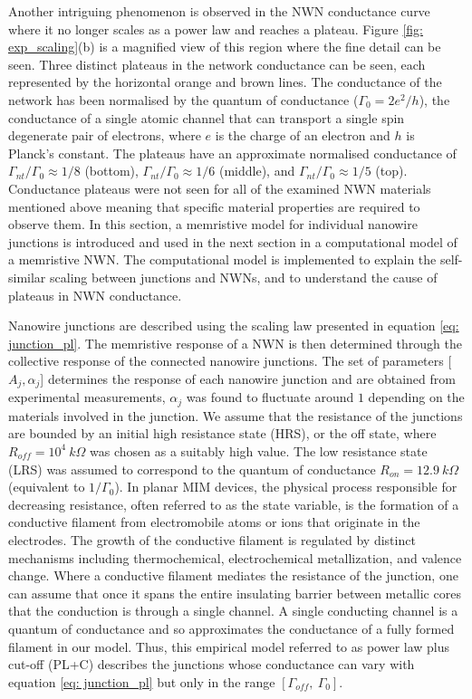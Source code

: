 Another intriguing phenomenon is observed in the NWN conductance curve where it no longer scales as a power law and reaches a plateau. Figure \ref{fig: exp_scaling}(b) is a magnified view of this region where the fine detail can be seen. Three distinct plateaus in the network conductance can be seen, each represented by the horizontal orange and brown lines. The conductance of the network has been normalised by the quantum of conductance ($\Gamma_0 = 2 e^2/h$), the conductance of a single atomic channel that can transport a single spin degenerate pair of electrons, where $e$ is the charge of an electron and $h$ is Planck's constant. The plateaus have an approximate normalised conductance of $\Gamma_{nt}/\Gamma_0 \approx 1/8$ (bottom), $\Gamma_{nt}/\Gamma_0 \approx 1/6$ (middle), and $\Gamma_{nt}/\Gamma_0 \approx 1/5$ (top). Conductance plateaus were not seen for all of the examined NWN materials mentioned above meaning that specific material properties are required to observe them. In this section, a memristive model for individual nanowire junctions is introduced and used in the next section in a computational model of a memristive NWN. The computational model is implemented to explain the self-similar scaling between junctions and NWNs, and to understand the cause of plateaus in NWN conductance.

Nanowire junctions are described using the scaling law presented in equation \ref{eq: junction_pl}. The memristive response of a NWN is then determined through the collective response of the connected nanowire junctions. The set of parameters [$A_j,\alpha_j$] determines the response of each nanowire junction and are obtained from experimental measurements, $\alpha_j$ was found to fluctuate around $1$ depending on the materials involved in the junction\cite{scaling2018}. We assume that the resistance of the junctions are bounded by an initial high resistance state (HRS), or the off state, where $R_{off} = 10^4~ k \Omega$ was chosen as a suitably high value. The low resistance state (LRS) was assumed to correspond to the quantum of conductance $R_{on} = 12.9~k\Omega$ (equivalent to $1/\Gamma_0$). In planar MIM devices, the physical process responsible for decreasing resistance, often referred to as the state variable, is the formation of a conductive filament from electromobile atoms or ions that originate in the electrodes\cite{yang2012}. The growth of the conductive filament is regulated by distinct mechanisms including thermochemical, electrochemical metallization, and valence change\cite{memristors2014,lim2015,jeong2012,manning2017,waser2009}. Where a conductive filament mediates the resistance of the junction, one can assume that once it spans the entire insulating barrier between metallic cores that the conduction is through a single channel. A single conducting channel is a quantum of conductance and so approximates the conductance of a fully formed filament in our model. Thus, this empirical model referred to as power law plus cut-off (PL+C) describes the junctions whose conductance can vary with equation \ref{eq: junction_pl} but only in the range $[\Gamma_{off},~\Gamma_{0}]$.

